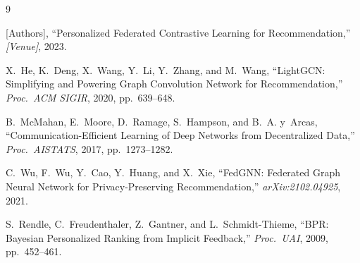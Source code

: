 \documentclass[10pt,twocolumn]{article}
\begin{document}

\begin{thebibliography}{9}

[Authors],
``Personalized Federated Contrastive Learning for Recommendation,''
\textit{[Venue]}, 2023.

X.~He, K.~Deng, X.~Wang, Y.~Li, Y.~Zhang, and M.~Wang,
``LightGCN: Simplifying and Powering Graph Convolution Network for
Recommendation,''
\textit{Proc.\ ACM SIGIR}, 2020, pp.~639--648.

B.~McMahan, E.~Moore, D.~Ramage, S.~Hampson, and B.~A. y~Arcas,
``Communication-Efficient Learning of Deep Networks from Decentralized
Data,''
\textit{Proc.\ AISTATS}, 2017, pp.~1273--1282.

C.~Wu, F.~Wu, Y.~Cao, Y.~Huang, and X.~Xie,
``FedGNN: Federated Graph Neural Network for Privacy-Preserving
Recommendation,''
\textit{arXiv:2102.04925}, 2021.

S.~Rendle, C.~Freudenthaler, Z.~Gantner, and L.~Schmidt-Thieme,
``BPR: Bayesian Personalized Ranking from Implicit Feedback,''
\textit{Proc.\ UAI}, 2009, pp.~452--461.

\end{thebibliography}
\end{document}
